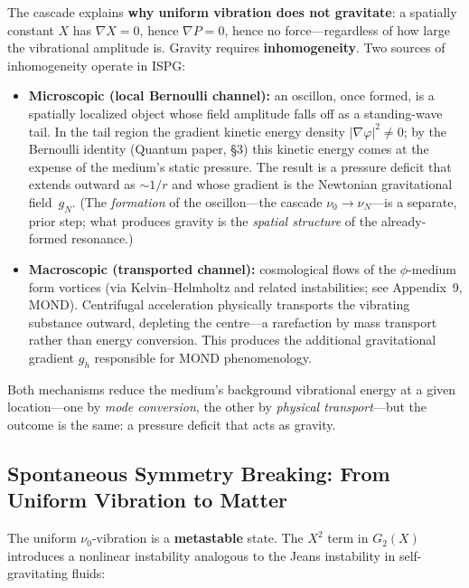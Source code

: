 \documentclass[11pt]{article}
\begin{document}
The cascade explains \textbf{why uniform vibration
does not gravitate}: a spatially constant $X$
has $\nabla X = 0$, hence $\nabla P = 0$, hence
no force---regardless of how large the vibrational
amplitude is. Gravity requires
\textbf{inhomogeneity}. Two sources of
inhomogeneity operate in ISPG:
\begin{itemize}
  \item \textbf{Microscopic (local Bernoulli channel):}
    an oscillon, once formed, is a spatially localized
    object whose field amplitude falls off as a
    standing-wave tail.  In the tail region the
    gradient kinetic energy density
    $|\nabla\varphi|^2 \neq 0$; by the Bernoulli
    identity (Quantum paper, \S3) this kinetic energy
    comes at the expense of the medium's static
    pressure.  The result is a pressure deficit that
    extends outward as $\sim 1/r$ and whose gradient
    is the Newtonian gravitational field~$g_N$.
    (The \emph{formation} of the oscillon---the
    cascade $\nu_0 \to \nu_N$---is a separate,
    prior step; what produces gravity is the
    \emph{spatial structure} of the already-formed
    resonance.)
  \item \textbf{Macroscopic (transported channel):}
    cosmological flows of the $\phi$-medium form
    vortices (via Kelvin--Helmholtz and related
    instabilities; see Appendix~9, MOND).
    Centrifugal acceleration physically transports
    the vibrating substance outward, depleting the
    centre---a rarefaction by mass transport rather
    than energy conversion. This produces the
    additional gravitational gradient $g_h$ responsible
    for MOND phenomenology.
\end{itemize}
Both mechanisms reduce the medium's background
vibrational energy at a given location---one by
\emph{mode conversion}, the other by \emph{physical
transport}---but the outcome is the same: a
pressure deficit that acts as gravity.

\subsection{Spontaneous Symmetry Breaking:
  From Uniform Vibration to Matter}
\label{sec:spontaneous}

The uniform $\nu_0$-vibration is a
\textbf{metastable} state. The $X^2$ term in
$G_2(X)$ introduces a nonlinear instability
analogous to the Jeans instability in
self-gravitating fluids:
\end{document}
